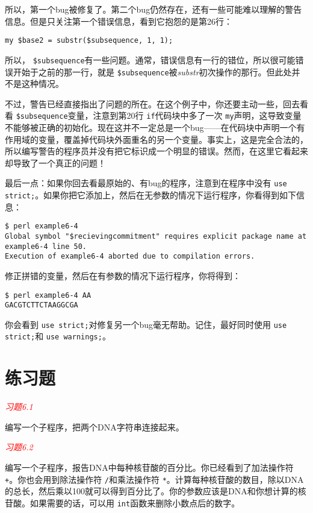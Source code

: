 所以，第一个bug被修复了。第二个bug仍然存在，还有一些可能难以理解的警告信息。但是只关注第一个错误信息，看到它抱怨的是第26行：

\begin{lstlisting}
my $base2 = substr($subsequence, 1, 1);
\end{lstlisting}

所以， \verb|$subsequence|有一些问题。通常，错误信息有一行的错位，所以很可能错误开始于之前的那一行，就是 \verb|$subsequence|被\textit{substr}初次操作的那行。但此处并不是这种情况。

不过，警告已经直接指出了问题的所在。在这个例子中，你还要主动一些，回去看看 \verb|$subsequence|变量，注意到第20行 \verb|if|代码块中多了一次 \verb|my|声明，这导致变量不能够被正确的初始化。现在这并不一定总是一个bug——在代码块中声明一个有作用域的变量，覆盖掉代码块外面重名的另一个变量。事实上，这是完全合法的，所以编写警告的程序员并没有把它标识成一个明显的错误。然而，在这里它看起来却导致了一个真正的问题！

最后一点：如果你回去看最原始的、有bug的程序，注意到在程序中没有 \verb|use strict;|。如果你把它添加上，然后在无参数的情况下运行程序，你看得到如下信息：

\begin{lstlisting}
$ perl example6-4   
Global symbol "$recievingcommitment" requires explicit package name at example6-4 line 50.
Execution of example6-4 aborted due to compilation errors.
\end{lstlisting}

修正拼错的变量，然后在有参数的情况下运行程序，你将得到：

\begin{lstlisting}
$ perl example6-4 AA
GACGTCTTCTAAGGCGA
\end{lstlisting}

你会看到 \verb|use strict;|对修复另一个bug毫无帮助。记住，最好同时使用 \verb|use strict;|和 \verb|use warnings;|。

\section{练习题}
\textcolor{red}{\textit{习题6.1}}
\begin{adjustwidth}{4em}{}
编写一个子程序，把两个DNA字符串连接起来。
\end{adjustwidth}

\textcolor{red}{\textit{习题6.2}}
\begin{adjustwidth}{4em}{}
编写一个子程序，报告DNA中每种核苷酸的百分比。你已经看到了加法操作符 \verb|+|。你也会用到除法操作符 \verb|/|和乘法操作符 \verb|*|。计算每种核苷酸的数目，除以DNA的总长，然后乘以100就可以得到百分比了。你的参数应该是DNA和你想计算的核苷酸。如果需要的话，可以用 \verb|int|函数来删除小数点后的数字。
\end{adjustwidth}


